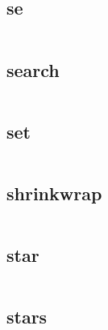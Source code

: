 \subsection{se}


\begin{lstlisting}[language=bash]

\end{lstlisting}

\subsection{search}



\begin{lstlisting}[language=bash]

\end{lstlisting}

\subsection{set}



\begin{lstlisting}[language=bash]

\end{lstlisting}

\subsection{shrinkwrap}




\begin{lstlisting}[language=bash]

\end{lstlisting}

\subsection{star}




\begin{lstlisting}[language=bash]

\end{lstlisting}

\subsection{stars}

\begin{lstlisting}[language=bash]

\end{lstlisting}

